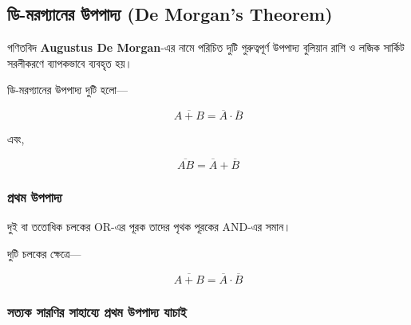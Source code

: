 \subsection{ডি-মরগ্যানের উপপাদ্য
(\textenglish{De Morgan's Theorem})}

গণিতবিদ \textbf{\textenglish{Augustus De Morgan}}-এর নামে পরিচিত
দুটি গুরুত্বপূর্ণ উপপাদ্য বুলিয়ান রাশি ও
লজিক সার্কিট সরলীকরণে ব্যাপকভাবে ব্যবহৃত হয়।

ডি-মরগ্যানের উপপাদ্য দুটি হলো—

\[
\boxed{
\overline{A+B}
=
\overline{A}\cdot\overline{B}
}
\]

এবং,

\[
\boxed{
\overline{AB}
=
\overline{A}+\overline{B}
}
\]


\subsubsection*{প্রথম উপপাদ্য}

\par\begingroup

দুই বা ততোধিক চলকের
\textenglish{OR}-এর পূরক তাদের পৃথক পূরকের
\textenglish{AND}-এর সমান।
\par\endgroup


দুটি চলকের ক্ষেত্রে—

\[
\boxed{
\overline{A+B}
=
\overline{A}\cdot\overline{B}
}
\]

\subsubsection*{সত্যক সারণির সাহায্যে প্রথম উপপাদ্য যাচাই}

\begin{center}
\scriptsize
{}
\end{center}

